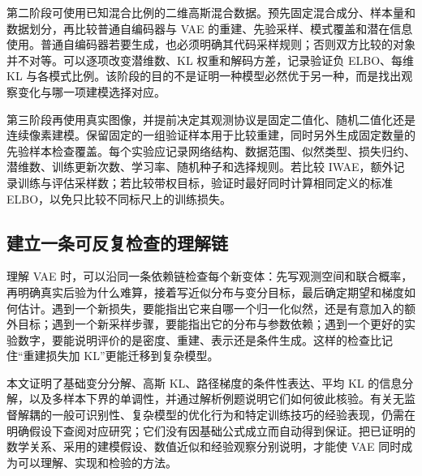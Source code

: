 \documentclass[UTF8,12pt,a4paper,fontset=fandol]{ctexart}
\begin{document}
第二阶段可使用已知混合比例的二维高斯混合数据。预先固定混合成分、样本量和数据划分，再比较普通自编码器与 VAE 的重建、先验采样、模式覆盖和潜在信息使用。普通自编码器若要生成，也必须明确其代码采样规则；否则双方比较的对象并不对等。可以逐项改变潜维数、KL 权重和解码方差，记录验证负 ELBO、每维 KL 与各模式比例。该阶段的目的不是证明一种模型必然优于另一种，而是找出观察变化与哪一项建模选择对应。

第三阶段再使用真实图像，并提前决定其观测协议是固定二值化、随机二值化还是连续像素建模。保留固定的一组验证样本用于比较重建，同时另外生成固定数量的先验样本检查覆盖。每个实验应记录网络结构、数据范围、似然类型、损失归约、潜维数、训练更新次数、学习率、随机种子和选择规则。若比较 IWAE，额外记录训练与评估采样数；若比较带权目标，验证时最好同时计算相同定义的标准 ELBO，以免只比较不同标尺上的训练损失。

\subsection{建立一条可反复检查的理解链}
理解 VAE 时，可以沿同一条依赖链检查每个新变体：先写观测空间和联合概率，再明确真实后验为什么难算，接着写近似分布与变分目标，最后确定期望和梯度如何估计。遇到一个新损失，要能指出它来自哪一个归一化似然，还是有意加入的额外目标；遇到一个新采样步骤，要能指出它的分布与参数依赖；遇到一个更好的实验数字，要能说明评价的是密度、重建、表示还是条件生成。这样的检查比记住“重建损失加 KL”更能迁移到复杂模型。

本文证明了基础变分分解、高斯 KL、路径梯度的条件性表达、平均 KL 的信息分解，以及多样本下界的单调性，并通过解析例题说明它们如何彼此核验。有关无监督解耦的一般可识别性、复杂模型的优化行为和特定训练技巧的经验表现，仍需在明确假设下查阅对应研究；它们没有因基础公式成立而自动得到保证。把已证明的数学关系、采用的建模假设、数值近似和经验观察分别说明，才能使 VAE 同时成为可以理解、实现和检验的方法。
\end{document}
